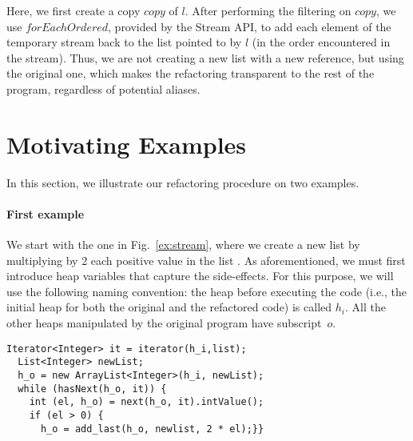 \documentclass[runningheads,a4paper]{llncs}
\begin{document}
Here, we first create a copy $\mathit{copy}$ of $l$.  After performing the
filtering on $\mathit{copy}$, we use $\mathit{forEachOrdered}$, provided by
the Stream API, to add each element of the temporary stream back to the list
pointed to by $l$ (in the order encountered in the stream).  Thus, we are not
creating a new list with a new reference, but using the original one, which
makes the refactoring transparent to the rest of the program, regardless of
potential aliases.




\section{Motivating Examples} \label{sec:running-ex}
%
In this section, we illustrate our refactoring procedure 
on two examples. 

\paragraph{First example} We start with the one in Fig.~\ref{ex:stream},
where we create a new list by multiplying by 2 each positive value in
the list .
As aforementioned, we must first introduce heap variables that
capture the side-effects. For this purpose, we will use the following
naming convention: the heap before executing the code (i.e., the
initial heap for both the original and the refactored code) is called
$h_i$. All the other heaps manipulated by the original program have
subscript~$o$. %

\begin{lstlisting}[mathescape=true,showstringspaces=false]
  Iterator<Integer> it = iterator(h_i,list);
  List<Integer> newList;
  h_o = new ArrayList<Integer>(h_i, newList);
  while (hasNext(h_o, it)) {
    int (el, h_o) = next(h_o, it).intValue();
    if (el > 0) {
      h_o = add_last(h_o, newlist, 2 * el);}}
\end{lstlisting}

\end{document}
